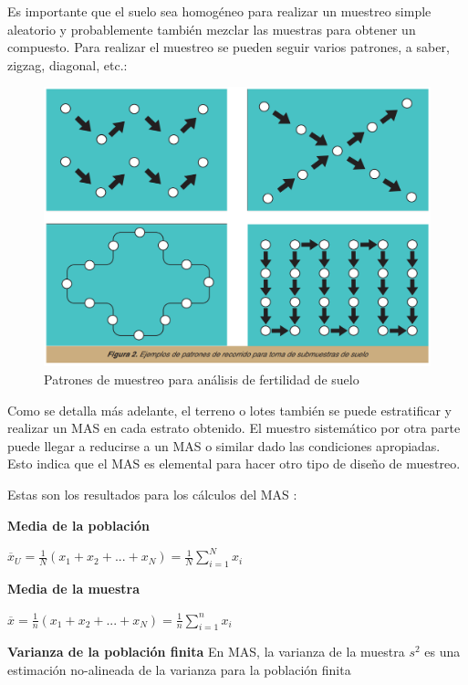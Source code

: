 \documentclass{report}
\begin{document}
Es importante que el suelo sea homogéneo para realizar un muestreo simple aleatorio y probablemente también mezclar las muestras para obtener un compuesto. Para realizar el muestreo se pueden seguir varios patrones, a saber, zigzag, diagonal, etc.:

\begin{figure}[H]
    \centering
    \includegraphics[width=0.3\paperwidth]{ref/sampling-patterns-srs.png}
    \caption{Patrones de muestreo para análisis de fertilidad de suelo \cite{lassaga-2011}}
\end{figure}

Como se detalla más adelante, el terreno o lotes también se puede estratificar y realizar un MAS en cada estrato obtenido. El muestro sistemático por otra parte puede llegar a reducirse a un MAS o similar dado las condiciones apropiadas. Esto indica que el MAS es elemental para hacer otro tipo de diseño de muestreo.

\bigbreak

Estas son los resultados para los cálculos del MAS \cite{thompson-2012}:

\bigbreak
\textbf{Media de la población}

\bigbreak

$\overline{x}_U = \frac{1}{N}(x_1 + x_2 + ... + x_N) = \frac{1}{N} \sum_{i=1}^N x_i$


\bigbreak
\textbf{Media de la muestra}

\bigbreak

$\overline{x} = \frac{1}{n}(x_1 + x_2 + ... + x_N) = \frac{1}{n} \sum_{i=1}^n x_i$


\bigbreak
\textbf{Varianza de la población finita} En MAS, la varianza de la muestra $s^2$ es una estimación no-alineada de la varianza para la población finita
\end{document}
